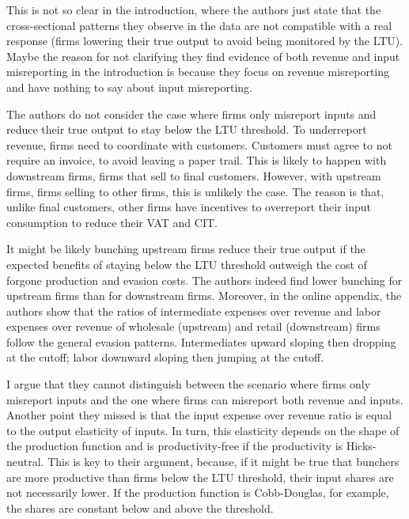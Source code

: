 \documentclass[
  12pt]{article}
\theoremstyle{definition}
\theoremstyle{remark}
\begin{document}
This is not so clear in the introduction, where the authors just state
that the cross-sectional patterns they observe in the data are not
compatible with a real response (firms lowering their true output to
avoid being monitored by the LTU). Maybe the reason for not clarifying
they find evidence of both revenue and input misreporting in the
introduction is because they focus on revenue misreporting and have
nothing to say about input misreporting.

The authors do not consider the case where firms only misreport inputs
and reduce their true output to stay below the LTU threshold. To
underreport revenue, firms need to coordinate with customers. Customers
must agree to not require an invoice, to avoid leaving a paper trail.
This is likely to happen with downstream firms, firms that sell to final
customers. However, with upstream firms, firms selling to other firms,
this is unlikely the case. The reason is that, unlike final customers,
other firms have incentives to overreport their input consumption to
reduce their VAT and CIT.

It might be likely bunching upstream firms reduce their true output if
the expected benefits of staying below the LTU threshold outweigh the
cost of forgone production and evasion costs. The authors indeed find
lower bunching for upstream firms than for downstream firms. Moreover,
in the online appendix, the authors show that the ratios of intermediate
expenses over revenue and labor expenses over revenue of wholesale
(upstream) and retail (downstream) firms follow the general evasion
patterns. Intermediates upward sloping then dropping at the cutoff;
labor downward sloping then jumping at the cutoff.

I argue that they cannot distinguish between the scenario where firms
only misreport inputs and the one where firms can misreport both revenue
and inputs. Another point they missed is that the input expense over
revenue ratio is equal to the output elasticity of inputs. In turn, this
elasticity depends on the shape of the production function and is
productivity-free if the productivity is Hicks-neutral. This is key to
their argument, because, if it might be true that bunchers are more
productive than firms below the LTU threshold, their input shares are
not necessarily lower. If the production function is Cobb-Douglas, for
example, the shares are constant below and above the threshold.
\end{document}
